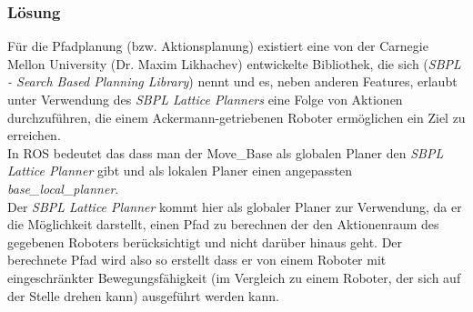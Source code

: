 \documentclass[oribibl]{llncs}
\begin{document}
\subsubsection{Lösung}
Für die Pfadplanung (bzw. Aktionsplanung) existiert eine von der Carnegie Mellon University (Dr. Maxim Likhachev\cite{likhachev}) entwickelte Bibliothek, die sich (\textit{SBPL - Search Based Planning Library}\cite{sbplMain}) nennt und es, neben anderen Features, erlaubt unter Verwendung des \textit{SBPL Lattice Planners} eine Folge von Aktionen durchzuführen, die einem Ackermann-getriebenen Roboter ermöglichen ein Ziel zu erreichen.\\
In ROS bedeutet das dass man der Move\_Base als globalen Planer den \textit{SBPL Lattice Planner} gibt und als lokalen Planer einen angepassten \textit{base\_local\_planner}.\\
Der \textit{SBPL Lattice Planner} kommt hier als globaler Planer zur Verwendung, da er die Möglichkeit darstellt, einen Pfad zu berechnen der den Aktionenraum des gegebenen Roboters berücksichtigt und nicht darüber hinaus geht. Der berechnete Pfad wird also so erstellt dass er von einem Roboter mit eingeschränkter Bewegungsfähigkeit (im Vergleich zu einem Roboter, der sich auf der Stelle drehen kann) ausgeführt werden kann.
\newpage
\end{document}
